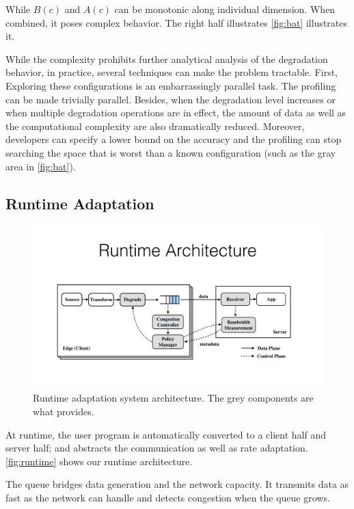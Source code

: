 While $B(c)$ and $A(c)$ can be monotonic along individual dimension. When
combined, it poses complex behavior. The right half illustrates
\autoref{fig:bat} illustrates it.

While the complexity prohibits further analytical analysis of the degradation
behavior, in practice, several techniques can make the problem tractable. First,
Exploring these configurations is an embarrassingly parallel task. The profiling
can be made trivially parallel. Besides, when the degradation level increases or
when multiple degradation operations are in effect, the amount of data as well
as the computational complexity are also dramatically reduced.  Moreover,
developers can specify a lower bound on the accuracy and the profiling can stop
searching the space that is worst than a known configuration (such as the gray
area in \autoref{fig:bat}).

\subsection{Runtime Adaptation}
\label{sec:adaptation}

\begin{figure}
  \centering
  \includegraphics[width=\linewidth]{figures/runtime.pdf}
  \caption{Runtime adaptation system architecture. The grey components are what
    \sysname{} provides.}
  \label{fig:runtime}
\end{figure}

At runtime, the user program is automatically converted to a client half and
server half; and \sysname{} abstracts the communication as well as rate
adaptation. \autoref{fig:runtime} shows our runtime architecture.

 The queue bridges data generation and
the network capacity. It transmits data as fast as the network can handle and
detects congestion when the queue grows.

